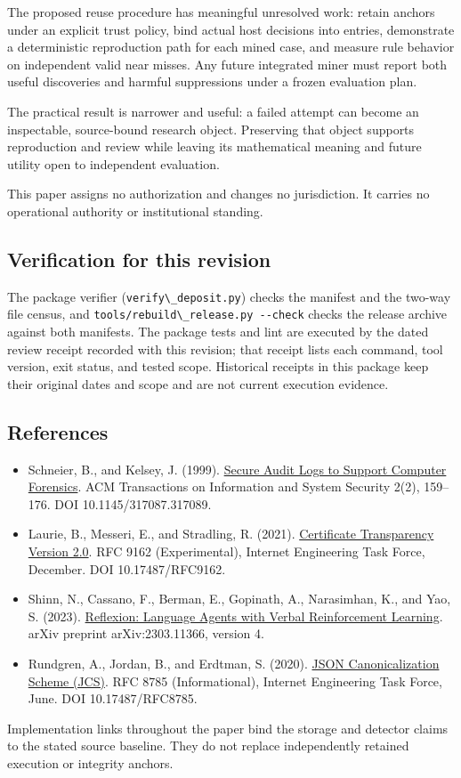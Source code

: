 \documentclass[
  11pt,
]{article}
\newcommand{\passthrough}[1]{#1}
\providecommand{\tightlist}{%
  \setlength{\itemsep}{0pt}\setlength{\parskip}{0pt}}
\begin{document}
The proposed reuse procedure has meaningful unresolved work: retain
anchors under an explicit trust policy, bind actual host decisions into
entries, demonstrate a deterministic reproduction path for each mined
case, and measure rule behavior on independent valid near misses. Any
future integrated miner must report both useful discoveries and harmful
suppressions under a frozen evaluation plan.

The practical result is narrower and useful: a failed attempt can become
an inspectable, source-bound research object. Preserving that object
supports reproduction and review while leaving its mathematical meaning
and future utility open to independent evaluation.

This paper assigns no authorization and changes no jurisdiction. It
carries no operational authority or institutional standing.

\subsection{Verification for this
revision}\label{verification-for-this-revision}

The package verifier (\passthrough{\lstinline!verify\_deposit.py!})
checks the manifest and the two-way file census, and
\passthrough{\lstinline!tools/rebuild\_release.py --check!} checks the
release archive against both manifests. The package tests and lint are
executed by the dated review receipt recorded with this revision; that
receipt lists each command, tool version, exit status, and tested scope.
Historical receipts in this package keep their original dates and scope
and are not current execution evidence.

\subsection{References}\label{references}

\begin{itemize}
\tightlist
\item
  Schneier, B., and Kelsey, J. (1999).
  \href{https://www.schneier.com/academic/archives/1999/05/secure_audit_logs_to.html}{Secure
  Audit Logs to Support Computer Forensics}. ACM Transactions on
  Information and System Security 2(2), 159--176. DOI
  10.1145/317087.317089.
\item
  Laurie, B., Messeri, E., and Stradling, R. (2021).
  \href{https://www.rfc-editor.org/rfc/rfc9162.html}{Certificate
  Transparency Version 2.0}. RFC 9162 (Experimental), Internet
  Engineering Task Force, December. DOI 10.17487/RFC9162.
\item
  Shinn, N., Cassano, F., Berman, E., Gopinath, A., Narasimhan, K., and
  Yao, S. (2023). \href{https://arxiv.org/abs/2303.11366v4}{Reflexion:
  Language Agents with Verbal Reinforcement Learning}. arXiv preprint
  arXiv:2303.11366, version 4.
\item
  Rundgren, A., Jordan, B., and Erdtman, S. (2020).
  \href{https://www.rfc-editor.org/rfc/rfc8785.html}{JSON
  Canonicalization Scheme (JCS)}. RFC 8785 (Informational), Internet
  Engineering Task Force, June. DOI 10.17487/RFC8785.
\end{itemize}

Implementation links throughout the paper bind the storage and detector
claims to the stated source baseline. They do not replace independently
retained execution or integrity anchors.
\end{document}
